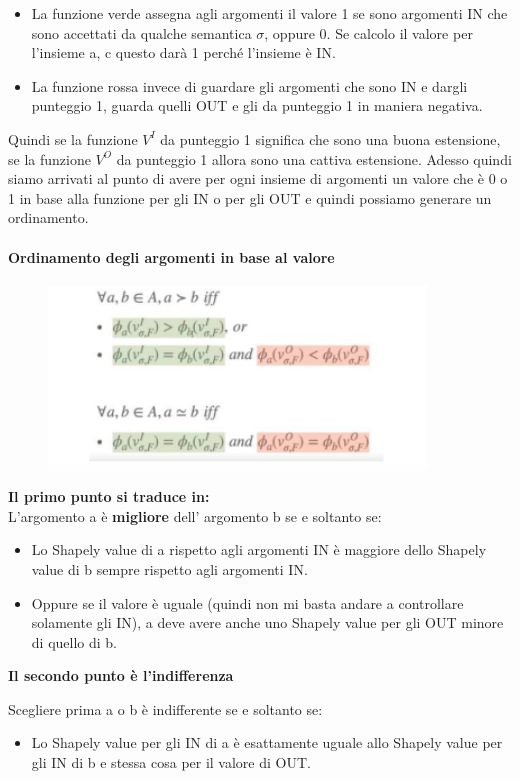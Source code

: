 \begin{itemize}
    \item La funzione verde assegna agli argomenti il valore 1 se sono
          argomenti IN che sono accettati da qualche semantica $\sigma$, oppure 0.
          Se calcolo il valore per l'insieme a, c questo darà 1 perché l'insieme è
          IN.
    \item La funzione rossa invece di guardare gli argomenti che sono IN e
          dargli punteggio 1, guarda quelli OUT e gli da punteggio 1 in maniera
          negativa.
\end{itemize}
Quindi se la funzione $V^I$ da punteggio 1 significa che sono una buona
estensione, se la funzione $V^O$ da punteggio 1 allora sono una cattiva
estensione. Adesso quindi siamo arrivati al punto di avere per ogni insieme
di argomenti un valore che è 0 o 1 in base alla funzione per gli IN o per
gli OUT e quindi possiamo generare un ordinamento.
\paragraph{Ordinamento degli argomenti in base al valore}
\begin{figure}[htp]
    \centering
    \includegraphics[width=10cm, keepaspectratio]{img/Cap8/ordinamento-valore.png}
\end{figure}
\textbf{Il primo punto si traduce in:}
\\L'argomento a è \textbf{migliore} dell' argomento b se e soltanto se:
\begin{itemize}
    \item Lo Shapely value di a rispetto agli argomenti IN è maggiore dello
          Shapely value di b sempre rispetto agli argomenti IN.
    \item Oppure se il valore è uguale (quindi non mi basta andare a controllare
          solamente gli IN), a deve avere anche uno Shapely value per gli OUT minore
          di quello di b.
\end{itemize}
\begin{center}
    \textbf{Il secondo punto è l'indifferenza}
\end{center}
Scegliere prima a o b è indifferente se e soltanto se:
\begin{itemize}
    \item Lo Shapely value per gli IN di a è esattamente uguale allo Shapely
          value per gli IN di b e stessa cosa per il valore di OUT.
\end{itemize}
